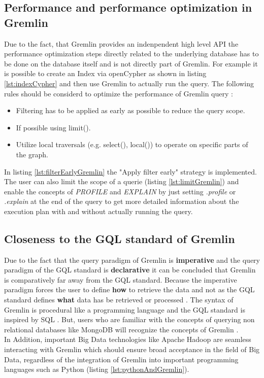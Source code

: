 \subsection{Performance and performance optimization in Gremlin}
\label{subsec:different_query_languages_for_graph_databases:gremlin:performance}
Due to the fact, that Gremlin provides an indenpendent high level API 
the performance optimization steps directly related to the underlying database
has to be done on the database itself and is not directly part of Gremlin.
For example it is possible to create an Index via openCypher as shown in listing 
\ref{lst:indexCypher} and then use Gremlin to actually run the query.
The following rules should be considerd
to optimize the performance of Gremlin query \citep{XU202212}:
\begin{itemize}
	\item Filtering has to be applied as early as possible to reduce the query scope.
	\item If possible using limit().
	\item Utilize local traversals (e.g. select(), local()) to operate on specific parts of the graph.
\end{itemize}
In listing \ref{lst:filterEarlyGremlin} the 
"Apply filter early" strategy is implemented.
The user can also limit the scope of a querie (listing \ref{lst:limitGremlin}) and 
enable the concepts of \textit{PROFILE} and \textit{EXPLAIN} by just setting
\textit{.profile} or \textit{.explain} at the end of the query to get more detailed 
information about the execution plan with and without actually running the query.

\subsection{Closeness to the GQL standard of Gremlin}
\label{subsec:different_query_languages_for_graph_databases:gremlin:iso}
Due to the fact that the query paradigm of Gremlin is \textbf{imperative} and the
query paradigm of the GQL standard is \textbf{declarative} it can be concluded that Gremlin 
is comparatively far away from the GQL standard. Because the imperative paradigm 
forces the user to define \textbf{how} to retrieve the data and not as the GQL standard
defines \textbf{what} data has be retrieved or processed \citep{apache_gremlin_2024}.
The syntax of Gremlin is procedural like a programming language and the GQL standard is
inspired by SQL \citep{hare_isoiec_2024}.\newline
But, users who are familiar with the concepts of querying non relational databases like 
MongoDB will recognize the concepts of Gremlin \citep{CABRAL2023102165}.\\
In Addition, important Big Data technologies like Apache Hadoop \citep{apache_hadoop_2024}
are seamless interacting with Gremlin which should ensure broad acceptance in the field of Big Data, 
regardless of the integration of Gremlin 
into important programming languages such as Python (listing \ref{lst:pythonAndGremlin}).

